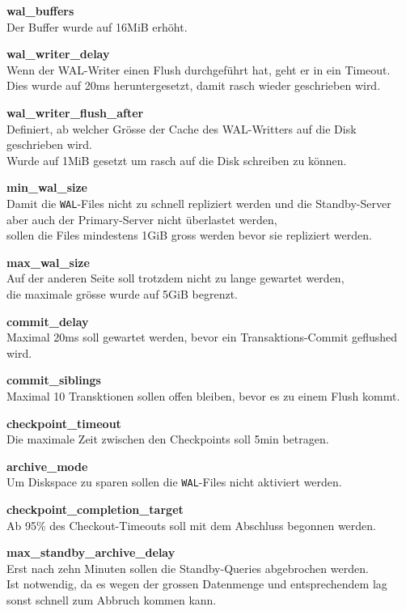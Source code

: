 \begin{flushleft}
\begin{description}
        \item \textbf{wal\_buffers}\hfill \\Der Buffer wurde auf 16MiB erhöht.
        \item \textbf{wal\_writer\_delay}\hfill \\Wenn der WAL-Writer einen Flush durchgeführt hat, geht er in ein Timeout.\\Dies wurde auf 20ms heruntergesetzt, damit rasch wieder geschrieben wird.
        \item \textbf{wal\_writer\_flush\_after}\hfill \\Definiert, ab welcher Grösse der Cache des WAL-Writters auf die Disk geschrieben wird.\\Wurde auf 1MiB gesetzt um rasch auf die Disk schreiben zu können.
        \item \textbf{min\_wal\_size}\hfill \\Damit die \texttt{WAL}-Files nicht zu schnell repliziert werden und die Standby-Server aber auch der Primary-Server nicht überlastet werden,\\sollen die Files mindestens 1GiB gross werden bevor sie repliziert werden.
        \item \textbf{max\_wal\_size}\hfill \\Auf der anderen Seite soll trotzdem nicht zu lange gewartet werden,\\die maximale grösse wurde auf 5GiB begrenzt.
        \item \textbf{commit\_delay}\hfill \\Maximal 20ms soll gewartet werden, bevor ein Transaktions-Commit geflushed wird.
        \item \textbf{commit\_siblings}\hfill \\Maximal 10 Transktionen sollen offen bleiben, bevor es zu einem Flush kommt.
        \item \textbf{checkpoint\_timeout}\hfill \\Die maximale Zeit zwischen den Checkpoints soll 5min betragen.
        \item \textbf{archive\_mode}\hfill \\Um Diskspace zu sparen sollen die \texttt{WAL}-Files nicht aktiviert werden.
        \item \textbf{checkpoint\_completion\_target}\hfill \\Ab 95\% des Checkout-Timeouts soll mit dem Abschluss begonnen werden.
        \item \textbf{max\_standby\_archive\_delay}\hfill \\Erst nach zehn Minuten sollen die Standby-Queries abgebrochen werden.\\Ist notwendig, da es wegen der grossen Datenmenge und entsprechendem lag sonst schnell zum Abbruch kommen kann.

\end{description}
\end{flushleft}
